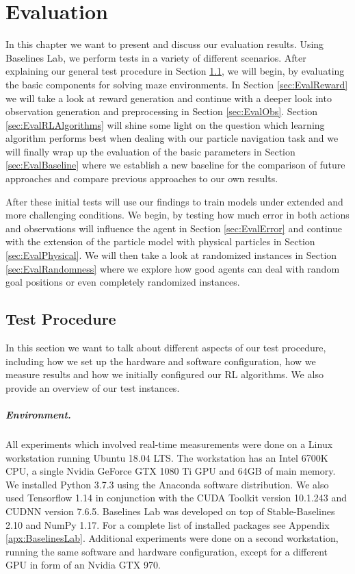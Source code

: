 \chapter{Evaluation} \label{chp:Evaluation}
In this chapter we want to present and discuss our evaluation results. Using Baselines Lab, we perform tests in a variety of different scenarios. After explaining our general test procedure in Section \ref{sec:TestProcedure}, we will begin, by evaluating the basic components for solving maze environments. In Section \ref{sec:EvalReward} we will take a look at reward generation and continue with a deeper look into observation generation and preprocessing in Section \ref{sec:EvalObs}. Section \ref{sec:EvalRLAlgorithms} will shine some light on the question which learning algorithm performs best when dealing with our particle navigation task and we will finally wrap up the evaluation of the basic parameters in Section \ref{sec:EvalBaseline} where we establish a new baseline for the comparison of future approaches and compare previous approaches to our own results.

After these initial tests will use our findings to train models under extended and more challenging conditions. We begin, by testing how much error in both actions and observations will influence the agent in Section \ref{sec:EvalError} and continue with the extension of the particle model with physical particles in Section \ref{sec:EvalPhysical}. We will then take a look at randomized instances in Section \ref{sec:EvalRandomness} where we explore how good agents can deal with random goal positions or even completely randomized instances.

\section{Test Procedure} \label{sec:TestProcedure}
In this section we want to talk about different aspects of our test procedure, including how we set up the hardware and software configuration, how we measure results and how we initially configured our RL algorithms. We also provide an overview of our test instances.

\paragraph{Environment.}
All experiments which involved real-time measurements were done on a Linux workstation running Ubuntu 18.04 LTS. The workstation has an Intel 6700K CPU, a single Nvidia GeForce GTX 1080 Ti GPU and 64GB of main memory. We installed Python 3.7.3 using the Anaconda \cite{anaconda} software distribution. We also used Tensorflow 1.14 in conjunction with the CUDA Toolkit version 10.1.243 and CUDNN version 7.6.5. Baselines Lab was developed on top of Stable-Baselines 2.10 and NumPy 1.17. For a complete list of installed packages see Appendix \ref{apx:BaselinesLab}. Additional experiments were done on a second workstation, running the same software and hardware configuration, except for a different GPU in form of an Nvidia GTX 970.


